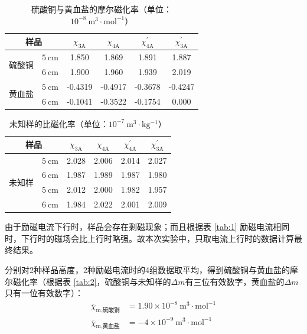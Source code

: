 \documentclass[cn,hazy,pku,12pt,normal,math=newtx,cite=super]{elegantnote}
\begin{document}
\begin{table}[H]
    \centering
    \caption{硫酸铜与黄血盐的摩尔磁化率（单位：$10^{-8} \mathrm{~m^3\cdot mol^{-1}}$）}
    \begin{tabular}{cccccc}
        \toprule
        \multicolumn{2}{c}{样品} & $\chi_{3\mathrm{A}}$ & $\chi_{4\mathrm{A}} $ &  $\chi_{4\mathrm{A}}^\prime$ &   $\chi_{3\mathrm{A}}^\prime $\\
        \midrule
        \multirow{2}{*}{硫酸铜} & $5 \mathrm{~cm}$ & 1.850 & 1.869 & 1.891 & 1.887  \\
        & $6 \mathrm{~cm}$ & 1.900 & 1.960 & 1.939 & 2.019  \\
        \midrule
        \multirow{2}{*}{黄血盐} & $5 \mathrm{~cm}$ & -0.4319 & -0.4917 & -0.3678 & -0.4247 \\
        & $6 \mathrm{~cm}$ & -0.1041 & -0.3522 & -0.1754 & 0.000  \\
        \bottomrule
    \end{tabular}
    \label{tab:3}
\end{table}

\begin{table}[H]
    \centering
    \caption{未知样的比磁化率（单位：$10^{-7} \mathrm{~m^3\cdot kg^{-1}}$）}
\begin{tabular}{cccccc}
\toprule
    \multicolumn{2}{c}{样品} & $\chi_{3\mathrm{A}}$ & $\chi_{4\mathrm{A}}$ &  $\chi_{4\mathrm{A}}^\prime$ &   $\chi_{3\mathrm{A}}^\prime$\\ 
    \midrule
    \multirow{4}{*}{未知样} & $5 \mathrm{~cm}$ & 2.028 & 2.006 & 2.014 & 2.027  \\
    & $6 \mathrm{~cm}$ & 1.987 & 1.989 & 1.987 & 1.980  \\
    & $5 \mathrm{~cm}$ & 2.012 & 2.000 & 1.982 & 1.957  \\
    & $6 \mathrm{~cm}$ & 1.984 & 2.022 & 2.001 & 2.009  \\
    \bottomrule
    \end{tabular}
    \label{tab:4}
\end{table}

由于励磁电流下行时，样品会存在剩磁现象；而且根据表 \ref{tab:1} 励磁电流相同时，下行时的磁场会比上行时略强。故本次实验中，只取电流上行时的数据计算最终结果。

分别对2种样品高度，2种励磁电流时的4组数据取平均，得到硫酸铜与黄血盐的摩尔磁化率（根据表 \ref{tab:2}，硫酸铜与未知样的$\Delta m$有三位有效数字，黄血盐的$\Delta m$只有一位有效数字）：
\begin{align*}
    \bar{\chi}_{\text{m,硫酸铜}} &= 1.90\times 10^{-8} \mathrm{~m^3\cdot mol^{-1}}\\
    \bar{\chi}_{\text{m,黄血盐}} &= -4\times 10^{-9} \mathrm{~m^3\cdot mol^{-1}}
\end{align*}
\end{document}
